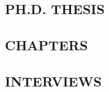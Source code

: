 \documentclass[11pt,letter,roman]{moderncv}
\begin{document}
\vspace{2em}

\subsection{PH.D. THESIS}

\begin{bibenum}
\item {}          %
\end{bibenum}
\vspace{2em}

%
%

\subsection{CHAPTERS}

\begin{bibenum}
\item {}          %
\end{bibenum}
\vspace{2em}

% 
\subsection{INTERVIEWS}
\sloppy
\begin{bibenum}
\item {}
\item {}
\end{bibenum}
\end{document}
